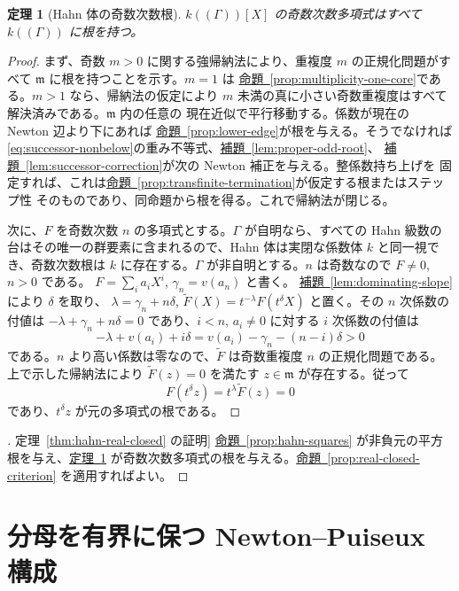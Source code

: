 \documentclass[11pt,uplatex,dvipdfmx]{jsarticle}
\newcommand{\Val}{v}
\newcommand{\namedref}[2]{\hyperref[#2]{#1~\ref*{#2}}}
\theoremstyle{proofnote}
\newtheorem{theorem}{定理}[section]
\begin{document}
\begin{theorem}[Hahn 体の奇数次数根]
\label{thm:hahn-odd-roots}
  \(k((\Gamma))[X]\) の奇数次数多項式はすべて \(k((\Gamma))\) に根を持つ。
\end{theorem}
\begin{proof}
  まず、奇数 \(m>0\) に関する強帰納法により、重複度 \(m\) の正規化問題がすべて
  \(\mathfrak m\) に根を持つことを示す。\(m=1\) は
  \namedref{命題}{prop:multiplicity-one-core}である。\(m>1\) なら、帰納法の仮定により
  \(m\) 未満の真に小さい奇数重複度はすべて解決済みである。\(\mathfrak m\) 内の任意の
  現在近似で平行移動する。係数が現在の Newton 辺より下にあれば
  \namedref{命題}{prop:lower-edge}が根を与える。そうでなければ
  \eqref{eq:successor-nonbelow}の重み不等式、\namedref{補題}{lem:proper-odd-root}、
  \namedref{補題}{lem:successor-correction}が次の Newton 補正を与える。整係数持ち上げを
  固定すれば、これは\namedref{命題}{prop:transfinite-termination}が仮定する根またはステップ性
  そのものであり、同命題から根を得る。これで帰納法が閉じる。

  次に、\(F\) を奇数次数 \(n\) の多項式とする。\(\Gamma\) が自明なら、すべての Hahn 級数の
  台はその唯一の群要素に含まれるので、Hahn 体は実閉な係数体 \(k\) と同一視でき、奇数次数根は
  \(k\) に存在する。\(\Gamma\) が非自明とする。\(n\) は奇数なので \(F\ne0\), \(n>0\) である。
  \(F=\sum_i a_iX^i\), \(\gamma_n=\Val(a_n)\) と書く。
  \namedref{補題}{lem:dominating-slope}により \(\delta\) を取り、
  \(\lambda=\gamma_n+n\delta\),
  \(\widetilde F(X)=t^{-\lambda}F(t^\delta X)\) と置く。その \(n\) 次係数の付値は
  \(-\lambda+\gamma_n+n\delta=0\) であり、\(i<n\), \(a_i\ne0\) に対する \(i\) 次係数の付値は
  \[
    -\lambda+\Val(a_i)+i\delta
      =\Val(a_i)-\gamma_n-(n-i)\delta>0
  \]
  である。\(n\) より高い係数は零なので、\(\widetilde F\) は奇数重複度 \(n\) の正規化問題である。
  上で示した帰納法により
  \(\widetilde F(z)=0\) を満たす \(z\in\mathfrak m\) が存在する。従って
  \[
    F(t^\delta z)=t^\lambda\widetilde F(z)=0
  \]
  であり、\(t^\delta z\) が元の多項式の根である。
\end{proof}

\begin{proof}[\namedref{定理}{thm:hahn-real-closed} の証明]
  \namedref{命題}{prop:hahn-squares} が非負元の平方根を与え、\namedref{定理}{thm:hahn-odd-roots}
  が奇数次数多項式の根を与える。\namedref{命題}{prop:real-closed-criterion} を適用すればよい。
\end{proof}

\section{分母を有界に保つ Newton--Puiseux 構成}
\label{sec:puiseux-process}
\end{document}
